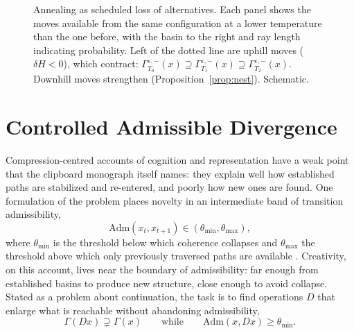 \documentclass[11pt]{article}
\theoremstyle{definition}
\theoremstyle{remark}
\begin{document}
\begin{figure}[t]
\centering
{}
\caption{Annealing as scheduled loss of alternatives. Each panel shows the moves available from the same configuration at a lower temperature than the one before, with the basin to the right and ray length indicating probability. Left of the dotted line are uphill moves ($\delta H<0$), which contract: $\Gamma_{T_0}^{\varepsilon,-}(x) \supseteq \Gamma_{T_1}^{\varepsilon,-}(x) \supseteq \Gamma_{T_2}^{\varepsilon,-}(x)$. Downhill moves strengthen (Proposition~\ref{prop:nest}). Schematic.}
\label{fig:anneal}
\end{figure}

\section{Controlled Admissible Divergence}\label{sec:divergence}

Compression-centred accounts of cognition and representation have a weak point that the clipboard monograph itself names: they explain well how established paths are stabilized and re-entered, and poorly how new ones are found. One formulation of the problem places novelty in an intermediate band of transition admissibility,
\begin{equation}
\mathrm{Adm}(x_t, x_{t+1}) \in (\theta_{\min}, \theta_{\max}),
\end{equation}
where $\theta_{\min}$ is the threshold below which coherence collapses and $\theta_{\max}$ the threshold above which only previously traversed paths are available \cite{flyxion-clipboard}. Creativity, on this account, lives near the boundary of admissibility: far enough from established basins to produce new structure, close enough to avoid collapse. Stated as a problem about continuation, the task is to find operations $D$ that enlarge what is reachable without abandoning admissibility,
\begin{equation}
\Gamma(Dx) \supsetneq \Gamma(x) \qquad\text{while}\qquad \mathrm{Adm}(x, Dx) \geq \theta_{\min}.
\end{equation}
\end{document}
